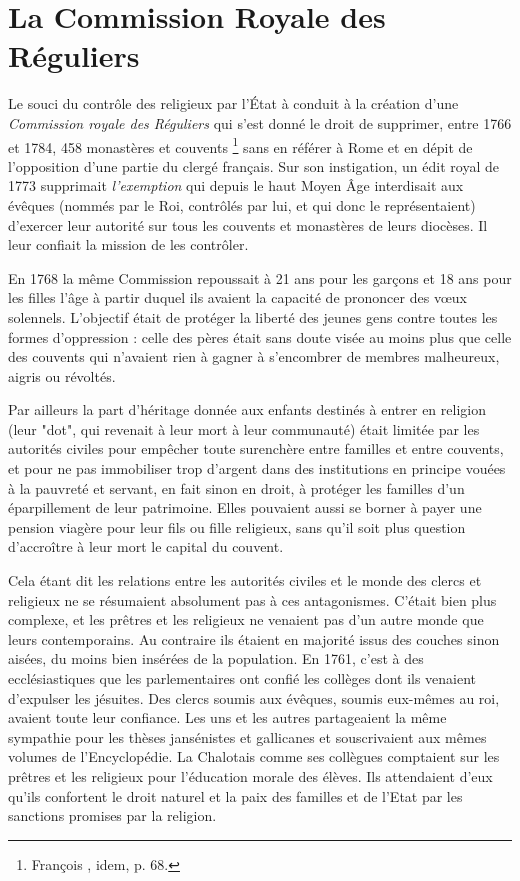 \section{La Commission Royale des Réguliers}


 Le souci du contrôle des religieux par l'État à conduit à la création d'une \emph{Commission royale des Réguliers} qui s'est donné le droit de supprimer, entre 1766 et 1784, 458 monastères et couvents%
\footnote{François , idem, p. 68.} 
sans en référer à Rome et en dépit de l'opposition d'une partie du clergé français. Sur son instigation, un édit royal de 1773 supprimait \emph{l'exemption} qui depuis le haut Moyen Âge interdisait aux évêques (nommés par le Roi, contrôlés par lui, et qui donc le représentaient) d'exercer leur autorité sur tous les couvents et monastères de leurs diocèses. Il leur confiait la mission de les contrôler. 

 En 1768 la même Commission repoussait à 21 ans pour les garçons et 18 ans pour les filles l'âge à partir duquel ils avaient la capacité de prononcer des vœux solennels. L'objectif était de protéger la liberté des jeunes gens contre toutes les formes d'oppression : celle des pères était sans doute visée au moins plus que celle des couvents qui n'avaient rien à gagner à s'encombrer de membres malheureux, aigris ou révoltés.

 Par ailleurs la part d'héritage donnée aux enfants destinés à entrer en religion (leur "dot", qui revenait à leur mort à leur communauté) était limitée par les autorités civiles pour empêcher toute surenchère entre familles et entre couvents, et pour ne pas immobiliser trop d'argent dans des institutions en principe vouées à la pauvreté et servant, en fait sinon en droit, à protéger les familles d'un éparpillement de leur patrimoine. Elles pouvaient aussi se borner à payer une pension viagère pour leur fils ou fille religieux, sans qu'il soit plus question d'accroître à leur mort le capital du couvent.

 Cela étant dit les relations entre les autorités civiles et le monde des clercs et religieux ne se résumaient absolument pas à ces antagonismes. C'était bien plus complexe, et les prêtres et les religieux ne venaient pas d'un autre monde que leurs contemporains. Au contraire ils étaient en majorité issus des couches sinon aisées, du moins bien insérées de la population. En 1761, c'est à des ecclésiastiques que les parlementaires ont confié les collèges dont ils venaient d'expulser les jésuites. Des clercs soumis aux évêques, soumis eux-mêmes au roi, avaient toute leur confiance. Les uns et les autres partageaient la même sympathie pour les thèses jansénistes et gallicanes et souscrivaient aux mêmes volumes de l'Encyclopédie. La Chalotais comme ses collègues comptaient sur les prêtres et les religieux pour l'éducation morale des élèves. Ils attendaient d'eux qu'ils confortent le droit naturel et la paix des familles et de l'Etat par les sanctions promises par la religion. 
 
